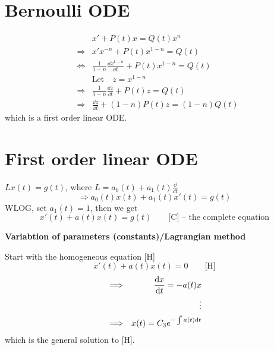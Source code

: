 \documentclass[twoside]{article}
\begin{document}
\section{Bernoulli ODE}
\begin{eqnarray}
    &&x' + P(t)x = Q(t)x^n\\
    &\Longrightarrow& x'x^{-n} + P(t)x^{1-n} = Q(t)\\
    &\iff& \frac{1}{1-n} \frac{\dd x^{1-n}}{\dd t} + P(t) x^{1-n} = Q(t)\\
    && \text{Let} \quad z = x^{1-n}\\
    &\Longrightarrow& \frac{1}{1-n} \frac{\dd z}{\dd t} + P(t) z = Q(t)\\
    &\Longrightarrow& \frac{\dd z}{\dd t} + (1-n)P(t) z = (1-n)Q(t)
\end{eqnarray}
which is a first order linear ODE.

\section{First order linear ODE}
$L x(t) = g(t)$, where $L = a_0(t)+a_1(t)\frac{\dd}{\dd t}$
\[
\Longrightarrow a_0(t)x(t)+a_1(t)x'(t) = g(t)
\]
WLOG, set $a_1(t) = 1$, then we get 
\begin{equation}
    x'(t) + a(t)x(t) = g(t) \qquad \text{[C] -- the complete equation}
\end{equation}

\textbf{Variabtion of parameters (constants)/Lagrangian method}

Start with the homogeneous equation [H]
\begin{equation}
    x'(t) + a(t)x(t) = 0 \qquad \text{[H]}
\end{equation}
\begin{eqnarray}
    &\Longrightarrow& \frac{\mathrm{d} x}{\mathrm{d} t} = - a(t)x\\
    &&\qquad \vdots \notag\\
    &\Longrightarrow& x(t) = C_3 e^{-\int a(t) \mathrm{d} t}
\end{eqnarray}
which is the general solution to [H].
\end{document}
